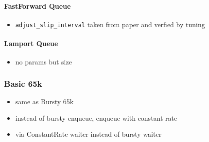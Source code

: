 \paragraph{FastForward Queue}
\begin{itemize}
    \item \texttt{adjust\_slip\_interval} taken from paper and verfied by tuning
\end{itemize}

\paragraph{Lamport Queue}
\begin{itemize}
    \item no params but size
\end{itemize}

\subsubsection{Basic 65k}
\begin{itemize}
    \item same as Bursty 65k
    \item instead of bursty enqueue, enqueue with constant rate
    \item via ConstantRate waiter instead of bursty waiter
\end{itemize}

